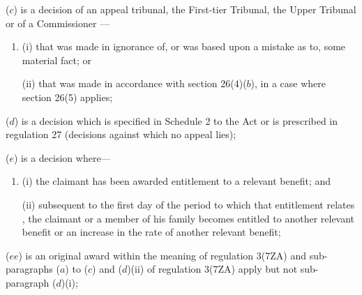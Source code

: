 \documentclass[12pt,a4paper]{article}
\begin{document}
\begin{enumerate}
($c$) is a decision of 
an appeal tribunal, the First-tier Tribunal, the Upper Tribunal or of a Commissioner%
—
\begin{enumerate}\item[]
(i) that was made in ignorance of, or was based upon a mistake as to, some material fact; or

(ii) that was made in accordance with section 26(4)($b$), in a case where section 26(5) applies;
\end{enumerate}

($d$) is a decision which is specified in Schedule 2 to the Act or is prescribed in regulation 27 (decisions against which no appeal lies); 

%

($e$) is a decision where—
\begin{enumerate}\item[]
(i) the claimant has been awarded entitlement to a relevant benefit; and

(ii) 
subsequent to the first day of the period to which that entitlement relates%
, the claimant or a member of his family becomes entitled to
another relevant benefit or an increase in the rate of another relevant benefit;
\end{enumerate}

($ee$) is an original award within the meaning of regulation 3(7ZA) and sub-paragraphs ($a$)  to ($c$)  and ($d$)(ii)  of regulation 3(7ZA) apply but not sub-paragraph ($d$)(i);


\end{enumerate}
\end{document}

